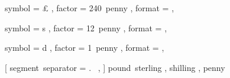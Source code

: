 

 {
	symbol = { £ } ,
	factor = { 240~penny } ,
	format = { \SYMBOL\VALUE } ,
}

 {
	symbol = { s } ,
	factor = { 12~penny } ,
	format = { \VALUE\SYMBOL } ,
}

 {
	symbol = { d } ,
	factor = { 1~penny } ,
	format = { \VALUE\SYMBOL } ,
}

 [
	segment~separator = {.~} ,
] {
	pound~sterling ,
	shilling ,
	penny
}
